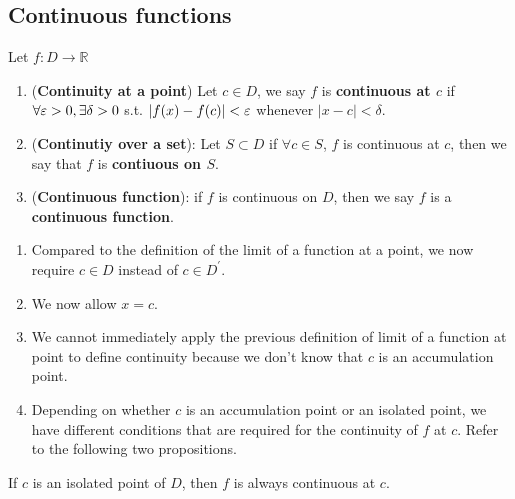 \subsection{Continuous functions}


\begin{definition}[Continuity]
    Let $f: D \to \mathbb{R}$
    \begin{enumerate}
        \item (\textbf{Continuity at a point})
    Let $c \in D$,  
    we say $f$  is \textbf{continuous at $c$} if 
    $\forall \varepsilon > 0, \exists \delta > 0$ s.t. 
    $|f(x) - f(c)| < \varepsilon$ whenever 
    $|x - c| < \delta$.
        \item (\textbf{Continutiy over a set}): Let $S \subset D$
    if $\forall c \in S$, $f$ is continuous at $c$, then we say 
    that $f$ is \textbf{contiuous on $S$}.
        \item (\textbf{Continuous function}): if $f$ is continuous
    on $D$, then we say $f$ is a \textbf{continuous function}.
    \end{enumerate} 
\end{definition}

\begin{remark}
    \hfill
    \begin{enumerate}
        \item Compared to the definition of 
        the limit of a function at a point,
        we now require $c \in D$ instead of $c \in D^{\prime}$.
        \item We now allow $x = c$.
        \item We cannot immediately apply the previous definition 
        of limit of a function at point to define continuity
        because 
        we don't know that $c$ is an accumulation point.
        \item Depending on whether $c$ is an accumulation point
        or an isolated point, we have different conditions
        that are required for the continuity of $f$ at $c$. 
        Refer to the following two propositions.
    \end{enumerate} 
\end{remark}

\begin{proposition}
    If $c$ is an isolated point of $D$, then 
    $f$ is always continuous at $c$.
\end{proposition}

